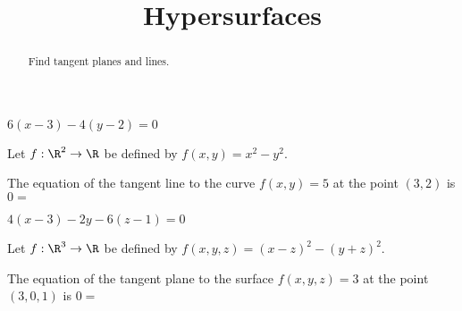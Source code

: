 \documentclass{ximera}
\title{Hypersurfaces}
\begin{document}
	\begin{abstract}
		Find tangent planes and lines.
	\end{abstract}\maketitle
	
	\begin{question}
		\begin{hint}
			$6(x-3)-4(y-2) = 0$
		\end{hint}
		Let $f:\R^2 \to \R$ be defined by $f(x,y)=x^2-y^2$.
		\begin{question}
			The equation of the tangent line to the curve $f(x,y)=5$ at the point $(3,2)$ 
			is $0=$ 
		\end{question}
	\end{question}
	
	\begin{question}
		\begin{hint}
			$4(x-3)-2y-6(z-1) = 0$
		\end{hint}
		Let $f:\R^3 \to \R$ be defined by $f(x,y,z)=(x-z)^2-(y+z)^2$.
		\begin{question}
			The equation of the tangent plane to the surface $f(x,y,z)=3$ at the point $(3,0,1)$ 
			is $0=$ \answer{$4(x-3)-2y-6(z-1)$}
		\end{question}
	\end{question}

	
\end{document}
